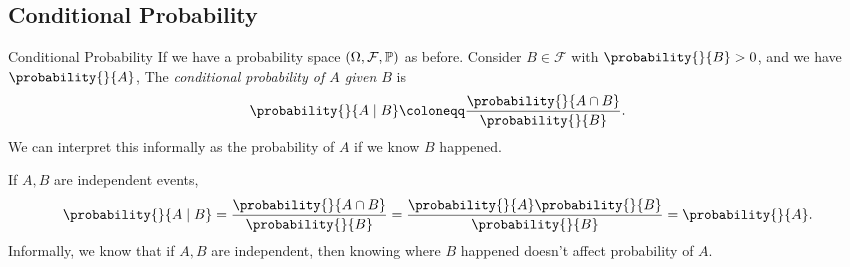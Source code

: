 \subsection{Conditional Probability}
\leavevmode
\begin{definition}{Conditional Probability}{}
    If we have a probability space \((\Omega, \mathcal{F}, \mathbb{\MakeUppercase{P}})\) as before. Consider \(B \in \mathcal{F} \) with \(\probability{}{B} >0\), and we have \(\probability{}{A} \), The \textit{conditional probability of \(A\) given \(B\)} is
    \[
        \probability{}{A\mid B}\coloneqq \frac{\probability{}{A\cap B} }{\probability{}{B} }.
    \]
    We can interpret this informally as the probability of \(A\) if we know \(B\) happened.
\end{definition}
\begin{example}
    If \(A, B\) are independent events,
    \[
        \probability{}{A\mid B} = \frac{\probability{}{A\cap B}}{\probability{}{B} } = \frac{\probability{}{A} \probability{}{B} }{\probability{}{B} }=\probability{}{A} .
    \]
    Informally, we know that if \(A, B\) are independent, then knowing where \(B\) happened doesn't affect probability of \(A\).
\end{example}
